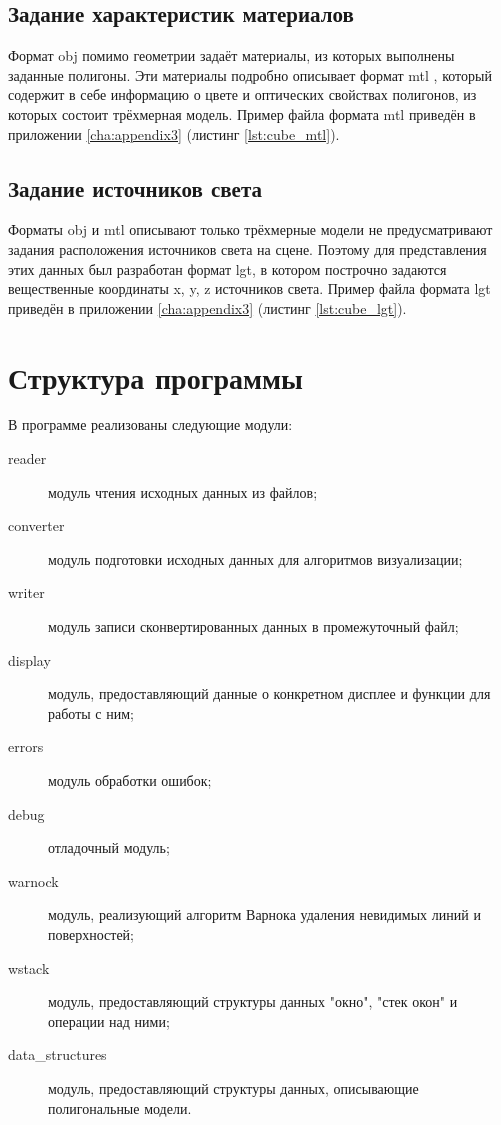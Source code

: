 \subsection{Задание характеристик материалов}
Формат obj помимо геометрии задаёт материалы, из которых выполнены заданные полигоны. Эти материалы подробно описывает формат 
mtl \cite{mtl}, который содержит в себе информацию о цвете и оптических свойствах полигонов, из которых состоит трёхмерная модель. 
Пример файла формата mtl приведён в приложении \ref{cha:appendix3} (листинг \ref{lst:cube_mtl}).

\subsection{Задание источников света}
Форматы obj и mtl описывают только трёхмерные модели не предусматривают задания расположения источников света на сцене. Поэтому 
для представления этих данных был разработан формат lgt, в котором построчно задаются вещественные координаты x, y, z источников света. 
Пример файла формата lgt приведён в приложении \ref{cha:appendix3} (листинг \ref{lst:cube_lgt}).



\section{Структура программы}
В программе реализованы следующие модули:
\begin{description}
	\item[reader] модуль чтения исходных данных из файлов;
	\item[converter] модуль подготовки исходных данных для алгоритмов визуализации;
	\item[writer] модуль записи сконвертированных данных в промежуточный файл;
	\item[display] модуль, предоставляющий данные о конкретном дисплее и функции для работы с ним;
	\item[errors] модуль обработки ошибок;
	\item[debug] отладочный модуль;
	\item[warnock] модуль, реализующий алгоритм Варнока удаления невидимых линий и поверхностей;
	\item[wstack] модуль, предоставляющий структуры данных "окно"{}, "стек окон" и операции над ними;
	\item[data\_structures] модуль, предоставляющий структуры данных, описывающие полигональные модели.
\end{description}

